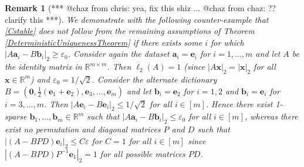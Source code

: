 \documentclass[journal, onecolumn]{IEEEtran}
\newtheorem{remark}{Remark}
\begin{document}
\begin{remark}
[*** @chaz from chris:  yea, fix this shiz ... @chaz from chaz: ?? clarify this ***] We demonstrate with the following counter-example that \eqref{Cstable} does not follow from the remaining assumptions of Theorem \ref{DeterministicUniquenessTheorem} if there exists some $i$ for which $|A\mathbf{a}_i - B\mathbf{b}_i|_2 \geq \varepsilon_0$. Consider again the dataset $\mathbf{a}_i = \mathbf{e}_i$ for $i = 1, \ldots, m$ and let $A$ be the identity matrix in $\mathbb{R}^{m \times m}$. Then $\ell_2(A) = 1$ (since $|A\mathbf{x}|_2 = |\mathbf{x}|_2$ for all $\mathbf{x} \in \mathbb{R}^m$) and $\varepsilon_0 = 1/\sqrt{2}$. Consider the alternate dictionary $B = \left( \mathbf{0}, \frac{1}{2}(\mathbf{e}_1 + \mathbf{e}_2), \mathbf{e}_3, \ldots, \mathbf{e}_{m} \right)$ and let $\mathbf{b}_i = \mathbf{e}_2$ for $i = 1, 2$ and $\mathbf{b}_i = \mathbf{e}_i$ for $i = 3, \ldots, m$. Then $|A\mathbf{e}_i - B\mathbf{e}_i|_2 \leq 1/\sqrt{2}$ for all $i \in [m]$. Hence there exist 1-sparse $\mathbf{b}_1, \ldots, \mathbf{b}_m \in \mathbb{R}^m$ such that $|A\mathbf{a}_i - B\mathbf{b}_i|_2 \leq \varepsilon_0$ for all $i \in [m]$, whereas there exist no permutation and diagonal matrices $P$ and $D$ such that $|(A - BPD)\mathbf{e}_i|_2 \leq C\varepsilon$ for $C=1$ for all $i \in [m]$ since $|(A - BPD)P^{-1}\mathbf{e}_1|_2 = 1$ for all possible matrices $PD$.
\end{remark}
\end{document}
